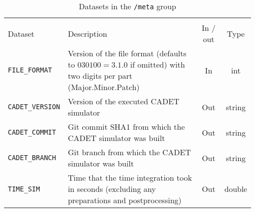 \begin{table}[!ht]
\footnotesize
\begin{tabu}to \linewidth[m]{lX[m]cc} \toprule
{} \\
\rowfont[c]\normalfont Dataset & Description & In / out & Type \everyrow{\midrule}\\      
\texttt{FILE\_FORMAT} & Version of the file format (defaults to $030100 = 3.1.0$ if omitted) with two digits per part (Major.Minor.Patch) & In & int \\
\texttt{CADET\_VERSION} & Version of the executed CADET simulator & Out & string \\
\texttt{CADET\_COMMIT} & Git commit SHA1 from which the CADET simulator was built & Out & string \\
\texttt{CADET\_BRANCH} & Git branch from which the CADET simulator was built & Out & string \\
\texttt{TIME\_SIM} & Time that the time integration took in seconds (excluding any preparations and postprocessing) & Out & double 
\everyrow{}\\
\bottomrule
\end{tabu}
\caption{\label{tab:FFMeta}Datasets in the \texttt{/meta} group}
\end{table}

\FloatBarrier
